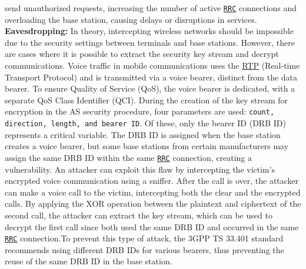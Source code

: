 \documentclass[english]{article}
\begin{document}
send unauthorized requests, increasing the number of active \texttt{\hyperlink{RRC}{RRC}}
connections and overloading the base station, causing delays or disruptions in services.
\\[0.2cm]
\textbf{Eavesdropping:}
In theory, intercepting wireless networks should be impossible due to
the security settings between terminals and base stations. However, there
are cases where it is possible to extract the security key stream and decrypt
communications. Voice traffic in mobile communications uses the \hyperlink{RTP}{RTP}
(Real-time Transport Protocol) and is transmitted via a voice bearer, distinct from
the data bearer. To ensure Quality of Service (QoS), the voice bearer is dedicated,
with a separate QoS Class Identifier (QCI). During the creation of the key stream
for encryption in the AS security procedure, four parameters are used:
\texttt{count, direction, length, and bearer ID}. Of these, only the bearer
ID (DRB ID) represents a critical variable. The DRB ID is assigned when the base
station creates a voice bearer, but some base stations from certain manufacturers
may assign the same DRB ID within the same \texttt{\hyperlink{RRC}{RRC}} connection, creating a vulnerability.
An attacker can exploit this flaw by intercepting the victim's encrypted voice
communication using a sniffer. After the call is over, the attacker can make a voice
call to the victim, intercepting both the clear and the encrypted calls. By applying
the XOR operation between the plaintext and ciphertext of the second call, the
attacker can extract the key stream, which can be used to decrypt the first call
since both used the same DRB ID and occurred in the same \texttt{\hyperlink{RRC}{RRC}} connection.\@ To prevent
this type of attack, the 3GPP TS 33.401 standard recommends using different DRB IDs for
various bearers, thus preventing the reuse of the same DRB ID in the base station.
\\[0.2cm]
\end{document}
